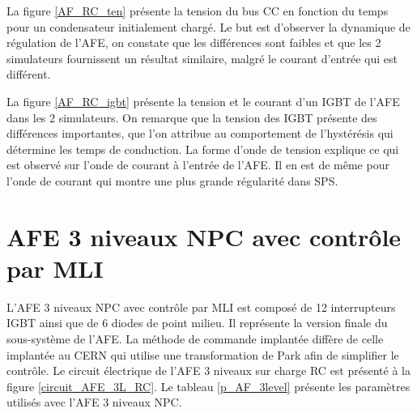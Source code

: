 La figure \ref{AF_RC_ten} présente la tension du bus CC en fonction du temps pour un condensateur initialement chargé. Le but est d'observer la dynamique de régulation de l'AFE, on constate que les différences sont faibles et que les 2 simulateurs fournissent un résultat similaire, malgré le courant d'entrée qui est différent.

La figure \ref{AF_RC_igbt} présente la tension et le courant d'un IGBT de l'AFE dans les 2 simulateurs. On remarque que la tension des IGBT présente des différences importantes, que l'on attribue au comportement de l'hystérésis qui détermine les temps de conduction. La forme d'onde de tension explique ce qui est observé sur l'onde de courant à l'entrée de l'AFE. Il en est de même pour l'onde de courant qui montre une plus grande régularité dans SPS.


\section{AFE 3 niveaux NPC avec contrôle par MLI}
L'AFE 3 niveaux NPC avec contrôle par MLI est composé de 12 interrupteurs IGBT ainsi que de 6 diodes de point milieu. Il représente la version finale du sous-système de l'AFE. La méthode de commande implantée diffère de celle implantée au CERN qui utilise une transformation de Park afin de simplifier le contrôle. Le circuit électrique de l'AFE 3 niveaux sur charge RC est présenté à la figure \ref{circuit_AFE_3L_RC}. Le tableau \ref{p_AF_3level} présente les paramètres utilisés avec l'AFE 3 niveaux NPC.


